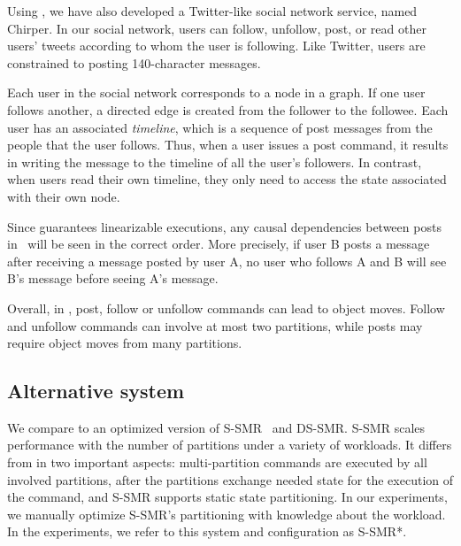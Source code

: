 Using \dynastar{}, we have also developed a Twitter-like social network service,
named Chirper. In our social network, users can follow, unfollow, post, or read
other users' tweets according to whom the user is following. Like Twitter, users
are constrained to posting 140-character messages.

Each user in the social network corresponds to a node in a graph. If one user
follows another, a directed edge is created from the follower to the followee.
Each user has an associated \emph{timeline}, which is a sequence of post
messages from the people that the user follows. Thus, when a user issues a post
command, it results in writing the message to the timeline of all the user's
followers.  In contrast, when users read their own timeline, they only need to
access the state associated with their own node.

Since \dynastar guarantees linearizable executions, any causal dependencies
between posts in \dynastarappname\ will be seen in the correct order. More
precisely, if user B posts a message after receiving a message posted by user A,
no user who follows A and B will see B's message before seeing A's message.

Overall, in \dynastarappname, post, follow or unfollow commands can lead to
object moves.  Follow and unfollow commands can involve at most two partitions,
while posts may require object moves from many partitions.



\subsection{Alternative system}

We compare \dynastar{} to an optimized version of S-SMR~\cite{bezerra2014ssmr}
and DS-SMR. S-SMR scales performance with the number of partitions under a
variety of workloads. It differs from \dynastar{} in two important aspects:
multi-partition commands are executed by all involved partitions, after the
partitions exchange needed state for the execution of the command, and S-SMR
supports static state partitioning. In our experiments, we manually optimize
S-SMR's partitioning with knowledge about the workload. In the experiments, we
refer to this system and configuration as S-SMR*.

